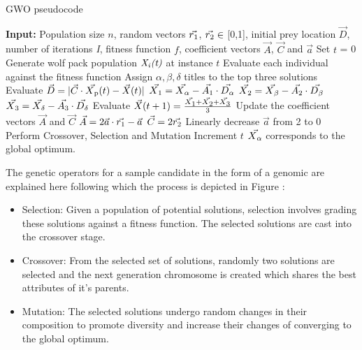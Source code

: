 \documentclass[conference]{IEEEtran}
\begin{document}
\begin{algorithm}[t]
\footnotesize
\caption{GWO pseudocode}
\label{alg:gwo}
\begin{algorithmic}[1]
\STATE \textbf{Input:} Population size $\textit{n}$, random vectors $\vec{r\textsubscript{1}}$, $\vec{r\textsubscript{2}} \in$ [0,1], initial prey location $\vec{D}$, number of iterations \textit{I}, fitness function $\textit{f}$, coefficient vectors $\vec{A}$, $\vec{C}$ and $\vec{a}$
\STATE Set $\textit{t}$ = 0
\STATE Generate wolf pack population $\textit{X\textsubscript{i}(t)}$ at instance $\textit{t}$
\STATE Evaluate each individual against the fitness function
\ENDFOR
\STATE Assign $\alpha, \beta, \delta$ titles to the top three solutions
\STATE Evaluate $\vec{D} = |\vec{C} \cdot \vec{X\textsubscript{p}}(t) - \vec{X}(t)|$
\STATE $\vec{X\textsubscript{1}} = \vec{X\textsubscript{$\alpha$}} - \vec{A\textsubscript{1}} \cdot  \vec{D\textsubscript{$\alpha$}}$
\STATE $\vec{X\textsubscript{2}} = \vec{X\textsubscript{$\beta$}} - \vec{A\textsubscript{2}} \cdot  \vec{D\textsubscript{$\beta$}}$
\STATE $\vec{X\textsubscript{3}} = \vec{X\textsubscript{$\delta$}} - \vec{A\textsubscript{3}} \cdot  \vec{D\textsubscript{$\delta$}}$
\STATE Evaluate $\vec{X}(t+1) = \frac{\vec{X\textsubscript{1}} + \vec{X\textsubscript{2}} + \vec{X\textsubscript{3}}}{3}$
\ENDFOR
\STATE Update the coefficient vectors $\vec{A}$ and $\vec{C}$
\STATE $\vec{A} = 2\vec{a} \cdot \vec{r\textsubscript{1}} - \vec{a}$
\STATE $\vec{C} = 2\vec{r\textsubscript{2}}$
\STATE Linearly decrease $\vec{a}$ from 2 to 0
\STATE Perform Crossover, Selection and Mutation
\STATE Increment $\textit{t}$
\ENDFOR
\STATE $\vec{X\textsubscript{$\alpha$}}$ corresponds to the global optimum. 
\end{algorithmic}
\end{algorithm}

The genetic operators for a sample candidate in the form of a genomic are explained here following which the process is depicted in Figure :
\begin{itemize}
\item Selection: Given a population of potential solutions, selection involves grading these solutions against a fitness function. The selected solutions are cast into the crossover stage.
\item Crossover: From the selected set of solutions, randomly two solutions are selected and the next generation chromosome is created which shares the best attributes of it's parents.
\item Mutation: The selected solutions undergo random changes in their composition to promote diversity and increase their changes of converging to the global optimum.
\end{itemize}
\end{document}
